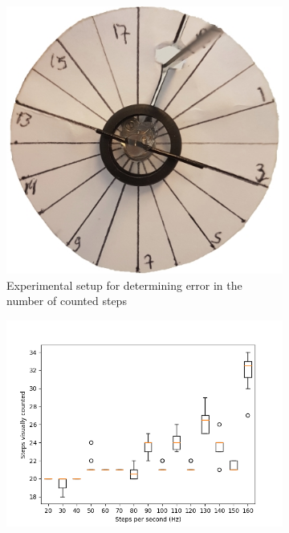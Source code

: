 \begin{figure}
	\centering
	\begin{subfigure}[b]{0.38\textwidth}
		\includegraphics[width=\textwidth]{pics/step_counting.jpg}
		\caption{Experimental setup for determining error in the number of counted steps}
		\label{fig:step_counting}
	\end{subfigure}
	\quad
	\begin{subfigure}[b]{0.55\textwidth}
		\includegraphics[width=\textwidth]{pics/figure_intertia.png}
		\caption{}
		\label{fig:step_results}
	\end{subfigure}
	\caption{}
\end{figure}

